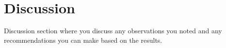 \chapter{Discussion}
Discussion section where you discuss any observations you noted and any recommendations you can make based on the results.